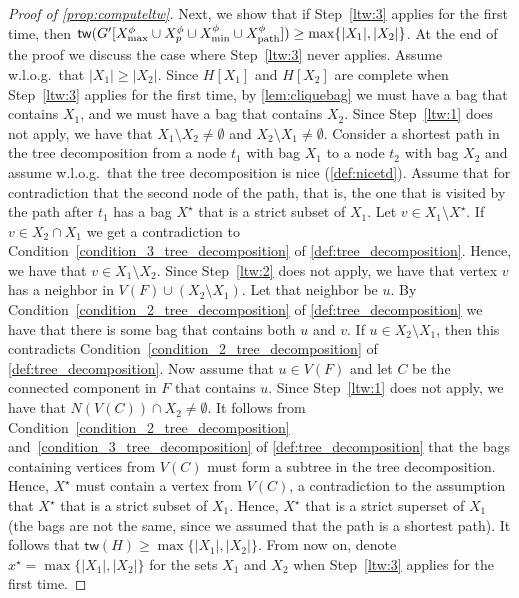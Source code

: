 \documentclass[a4paper,UKenglish,cleveref, autoref, thm-restate, numberwithinsect]{lipics-v2021}
\newcommand{\tw}{\mathsf{tw}}
\newcommand{\dpath}{\textup{path}}
\begin{document}
\begin{proof}[Proof of \cref{prop:computeltw}]
Next, we show that if Step~\ref{ltw:3} applies for the first time, then $\tw(G'[X^\phi_{\max}\cup X^\phi_p\cup X^\phi_{\min}\cup X^\phi_{\dpath}])\ge\max\{|X_1|,|X_2|\}$. At the end of the proof we discuss the case where Step~\ref{ltw:3} never applies.
Assume w.l.o.g.\ that $|X_1|\ge |X_2|$.
Since $H[X_1]$ and $H[X_2]$ are complete when Step~\ref{ltw:3} applies for the first time, by \cref{lem:cliquebag} we must have a bag that contains $X_1$, and we must have a bag that contains $X_2$.
Since Step~\ref{ltw:1} does not apply, we have that $X_1\setminus X_2\neq\emptyset$ and $X_2\setminus X_1\neq\emptyset$. 
Consider a shortest path in the tree decomposition from a node $t_1$ with bag $X_1$ to a node $t_2$ with bag $X_2$ and assume w.l.o.g.\ that the tree decomposition is nice (\cref{def:nicetd}). Assume that for contradiction that the second node of the path, that is, the one that is visited by the path after $t_1$ has a bag $X^\star$ that is a strict subset of $X_1$. Let $v\in X_1\setminus X^\star$. If $v\in X_2\cap X_1$ we get a contradiction to Condition~\ref{condition_3_tree_decomposition} of \cref{def:tree_decomposition}. Hence, we have that $v\in X_1\setminus X_2$.
Since Step~\ref{ltw:2} does not apply, we have that vertex $v$ has a neighbor in $V(F)\cup (X_2\setminus X_1)$. Let that neighbor be $u$. 
By Condition~\ref{condition_2_tree_decomposition} of \cref{def:tree_decomposition} we have that there is some bag that contains both $u$ and $v$. 
If $u\in X_2\setminus X_1$, then this contradicts Condition~\ref{condition_2_tree_decomposition} of \cref{def:tree_decomposition}.
Now assume that $u\in V(F)$ and let $C$ be the connected component in $F$ that contains $u$. Since Step~\ref{ltw:1} does not apply, we have that $N(V(C))\cap X_2\neq\emptyset$.
It follows from Condition~\ref{condition_2_tree_decomposition} and~\ref{condition_3_tree_decomposition} of \cref{def:tree_decomposition} that the bags containing vertices from $V(C)$ must form a subtree in the tree decomposition. Hence, $X^\star$ must contain a vertex from $V(C)$, a contradiction to the assumption that $X^\star$ that is a strict subset of $X_1$. Hence, $X^\star$ that is a strict superset of $X_1$ (the bags are not the same, since we assumed that the path is a shortest path). It follows that $\tw(H)\ge \max\{|X_1|,|X_2|\}$. From now on, denote $x^\star=\max\{|X_1|,|X_2|\}$ for the sets $X_1$ and $X_2$ when Step~\ref{ltw:3} applies for the first time.




\end{proof}
\end{document}
